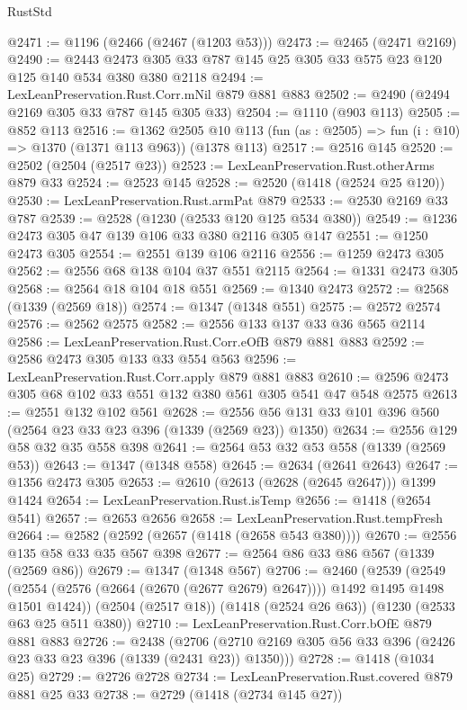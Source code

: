 \begin{lexlean}{RustStd}
\begin{coremodule}
{\begin{coremodule}
{{{{{{{{{{{{{{@2471 := @1196 (@2466 (@2467 (@1203 @53)))
@2473 := @2465 (@2471 @2169)
@2490 := @2443 @2473 @305 @33 @787 @145 @25 @305 @33 @575 @23 @120 @125 @140 @534 @380 @380 @2118
@2494 := LexLeanPreservation.Rust.Corr.mNil @879 @881 @883
@2502 := @2490 (@2494 @2169 @305 @33 @787 @145 @305 @33)
@2504 := @1110 (@903 @113)
@2505 := @852 @113
@2516 := @1362
    @2505
    @10
    @113
    (fun (as : @2505) => fun (i : @10) => @1370 (@1371 @113 @963))
    (@1378 @113)
@2517 := @2516 @145
@2520 := @2502 (@2504 (@2517 @23))
@2523 := LexLeanPreservation.Rust.otherArms @879 @33
@2524 := @2523 @145
@2528 := @2520 (@1418 (@2524 @25 @120))
@2530 := LexLeanPreservation.Rust.armPat @879
@2533 := @2530 @2169 @33 @787
@2539 := @2528 (@1230 (@2533 @120 @125 @534 @380))
@2549 := @1236 @2473 @305 @47 @139 @106 @33 @380 @2116 @305 @147
@2551 := @1250 @2473 @305
@2554 := @2551 @139 @106 @2116
@2556 := @1259 @2473 @305
@2562 := @2556 @68 @138 @104 @37 @551 @2115
@2564 := @1331 @2473 @305
@2568 := @2564 @18 @104 @18 @551
@2569 := @1340 @2473
@2572 := @2568 (@1339 (@2569 @18))
@2574 := @1347 (@1348 @551)
@2575 := @2572 @2574
@2576 := @2562 @2575
@2582 := @2556 @133 @137 @33 @36 @565 @2114
@2586 := LexLeanPreservation.Rust.Corr.eOfB @879 @881 @883
@2592 := @2586 @2473 @305 @133 @33 @554 @563
@2596 := LexLeanPreservation.Rust.Corr.apply @879 @881 @883
@2610 := @2596 @2473 @305 @68 @102 @33 @551 @132 @380 @561 @305 @541 @47 @548 @2575
@2613 := @2551 @132 @102 @561
@2628 := @2556 @56 @131 @33 @101 @396 @560 (@2564 @23 @33 @23 @396 (@1339 (@2569 @23)) @1350)
@2634 := @2556 @129 @58 @32 @35 @558 @398
@2641 := @2564 @53 @32 @53 @558 (@1339 (@2569 @53))
@2643 := @1347 (@1348 @558)
@2645 := @2634 (@2641 @2643)
@2647 := @1356 @2473 @305
@2653 := @2610 (@2613 (@2628 (@2645 @2647))) @1399 @1424
@2654 := LexLeanPreservation.Rust.isTemp
@2656 := @1418 (@2654 @541)
@2657 := @2653 @2656
@2658 := LexLeanPreservation.Rust.tempFresh
@2664 := @2582 (@2592 (@2657 (@1418 (@2658 @543 @380))))
@2670 := @2556 @135 @58 @33 @35 @567 @398
@2677 := @2564 @86 @33 @86 @567 (@1339 (@2569 @86))
@2679 := @1347 (@1348 @567)
@2706 := @2460
    (@2539
      (@2549 (@2554 (@2576 (@2664 (@2670 (@2677 @2679) @2647)))) @1492 @1495 @1498 @1501 @1424))
    (@2504 (@2517 @18))
    (@1418 (@2524 @26 @63))
    (@1230 (@2533 @63 @25 @511 @380))
@2710 := LexLeanPreservation.Rust.Corr.bOfE @879 @881 @883
@2726 := @2438
    (@2706 (@2710 @2169 @305 @56 @33 @396 (@2426 @23 @33 @23 @396 (@1339 (@2431 @23)) @1350)))
@2728 := @1418 (@1034 @25)
@2729 := @2726 @2728
@2734 := LexLeanPreservation.Rust.covered @879 @881 @25 @33
@2738 := @2729 (@1418 (@2734 @145 @27))
}}}}}}}}}}}}}}
\end{coremodule}}
\end{coremodule}
\end{lexlean}
